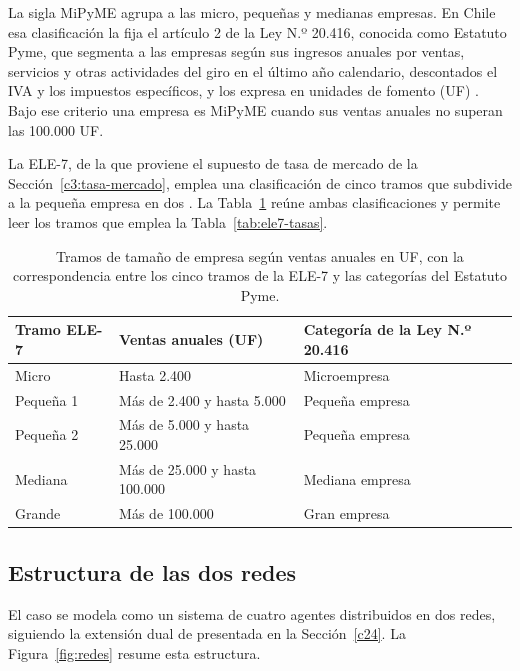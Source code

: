 La sigla MiPyME agrupa a las micro, pequeñas y medianas empresas. En Chile esa clasificación la fija el artículo 2 de la Ley N.º 20.416, conocida como Estatuto Pyme, que segmenta a las empresas según sus ingresos anuales por ventas, servicios y otras actividades del giro en el último año calendario, descontados el IVA y los impuestos específicos, y los expresa en unidades de fomento (UF) \cite{ley_20416_2010}. Bajo ese criterio una empresa es MiPyME cuando sus ventas anuales no superan las 100.000 UF.

La ELE-7, de la que proviene el supuesto de tasa de mercado de la Sección~\ref{c3:tasa-mercado}, emplea una clasificación de cinco tramos que subdivide a la pequeña empresa en dos \cite{ele7_metodologia_2024}. La Tabla~\ref{tab:tramos-tamano} reúne ambas clasificaciones y permite leer los tramos que emplea la Tabla~\ref{tab:ele7-tasas}.

\begin{table}[htbp]
\centering
\caption[Tramos de tamaño de empresa según ventas anuales]{Tramos de tamaño de empresa según ventas anuales en UF, con la correspondencia entre los cinco tramos de la ELE-7 y las categorías del Estatuto Pyme.}
\label{tab:tramos-tamano}
\small
\begin{tabular}{lll}
\hline
Tramo ELE-7 & Ventas anuales (UF) & Categoría de la Ley N.º 20.416 \\
\hline
Micro      & Hasta 2.400                      & Microempresa \\
Pequeña 1  & Más de 2.400 y hasta 5.000       & Pequeña empresa \\
Pequeña 2  & Más de 5.000 y hasta 25.000      & Pequeña empresa \\
Mediana    & Más de 25.000 y hasta 100.000    & Mediana empresa \\
Grande     & Más de 100.000                   & Gran empresa \\
\hline
\end{tabular}
\end{table}

\subsection{Estructura de las dos redes}
\label{c3:estructura}

El caso se modela como un sistema de cuatro agentes distribuidos en dos redes, siguiendo la extensión dual de  presentada en la Sección~\ref{c24}. La Figura~\ref{fig:redes} resume esta estructura.

